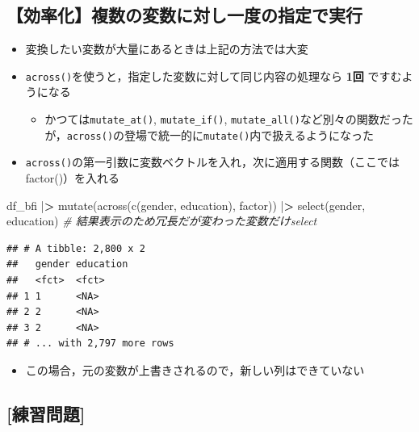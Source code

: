 \documentclass[
  xelatex,ja=standard, b5paper]{bxjsbook}
\newenvironment{Shaded}{\begin{snugshade}}{\end{snugshade}}
\newcommand{\CommentTok}[1]{\textcolor[rgb]{0.56,0.35,0.01}{\textit{#1}}}
\newcommand{\ErrorTok}[1]{\textcolor[rgb]{0.64,0.00,0.00}{\textbf{#1}}}
\newcommand{\FunctionTok}[1]{\textcolor[rgb]{0.00,0.00,0.00}{#1}}
\newcommand{\NormalTok}[1]{#1}
\newcommand{\SpecialCharTok}[1]{\textcolor[rgb]{0.00,0.00,0.00}{#1}}
\providecommand{\tightlist}{%
  \setlength{\itemsep}{0pt}\setlength{\parskip}{0pt}}
\begin{document}
\hypertarget{mu-kata-across}{%
\subsection{【効率化】複数の変数に対し一度の指定で実行}\label{mu-kata-across}}

\begin{itemize}
\tightlist
\item
  変換したい変数が大量にあるときは上記の方法では大変
\item
  \texttt{across()}を使うと，指定した変数に対して同じ内容の処理なら \textbf{1回} ですむようになる

  \begin{itemize}
  \tightlist
  \item
    かつては\texttt{mutate\_at()}, \texttt{mutate\_if()}, \texttt{mutate\_all()}など別々の関数だったが，\texttt{across()}の登場で統一的に\texttt{mutate()}内で扱えるようになった
  \end{itemize}
\item
  \texttt{across()}の第一引数に変数ベクトルを入れ，次に適用する関数（ここではfactor()）を入れる
\end{itemize}

\begin{Shaded}
\begin{Highlighting}[]
\NormalTok{df\_bfi }\SpecialCharTok{|}\ErrorTok{\textgreater{}}
  \FunctionTok{mutate}\NormalTok{(}\FunctionTok{across}\NormalTok{(}\FunctionTok{c}\NormalTok{(gender, education),}
\NormalTok{                factor)) }\SpecialCharTok{|}\ErrorTok{\textgreater{}} 
  \FunctionTok{select}\NormalTok{(gender, education)   }\CommentTok{\# 結果表示のため冗長だが変わった変数だけselect}
\end{Highlighting}
\end{Shaded}

\begin{verbatim}
## # A tibble: 2,800 x 2
##   gender education
##   <fct>  <fct>    
## 1 1      <NA>     
## 2 2      <NA>     
## 3 2      <NA>     
## # ... with 2,797 more rows
\end{verbatim}

\begin{itemize}
\tightlist
\item
  この場合，元の変数が上書きされるので，新しい列はできていない
\end{itemize}

\hypertarget{ux7df4ux7fd2ux554fux984c-10}{%
\subsection{{[}練習問題{]}}\label{ux7df4ux7fd2ux554fux984c-10}}
\end{document}
